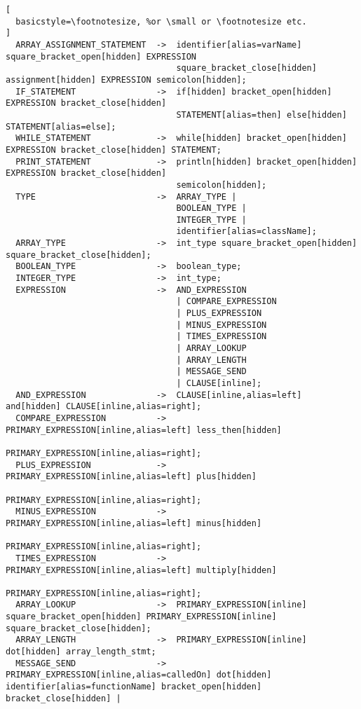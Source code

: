 \begin{lstlisting}[
  basicstyle=\footnotesize, %or \small or \footnotesize etc.
]
  ARRAY_ASSIGNMENT_STATEMENT  ->  identifier[alias=varName] square_bracket_open[hidden] EXPRESSION 
                                  square_bracket_close[hidden] assignment[hidden] EXPRESSION semicolon[hidden];
  IF_STATEMENT                ->  if[hidden] bracket_open[hidden] EXPRESSION bracket_close[hidden] 
                                  STATEMENT[alias=then] else[hidden] STATEMENT[alias=else];
  WHILE_STATEMENT             ->  while[hidden] bracket_open[hidden] EXPRESSION bracket_close[hidden] STATEMENT;
  PRINT_STATEMENT             ->  println[hidden] bracket_open[hidden] EXPRESSION bracket_close[hidden] 
                                  semicolon[hidden];
  TYPE                        ->  ARRAY_TYPE | 
                                  BOOLEAN_TYPE | 
                                  INTEGER_TYPE | 
                                  identifier[alias=className];
  ARRAY_TYPE                  ->  int_type square_bracket_open[hidden] square_bracket_close[hidden];
  BOOLEAN_TYPE                ->  boolean_type;
  INTEGER_TYPE                ->  int_type;
  EXPRESSION                  ->  AND_EXPRESSION
                                  | COMPARE_EXPRESSION
                                  | PLUS_EXPRESSION
                                  | MINUS_EXPRESSION
                                  | TIMES_EXPRESSION
                                  | ARRAY_LOOKUP
                                  | ARRAY_LENGTH
                                  | MESSAGE_SEND
                                  | CLAUSE[inline];
  AND_EXPRESSION              ->  CLAUSE[inline,alias=left] and[hidden] CLAUSE[inline,alias=right];
  COMPARE_EXPRESSION          ->  PRIMARY_EXPRESSION[inline,alias=left] less_then[hidden] 
                                  PRIMARY_EXPRESSION[inline,alias=right];
  PLUS_EXPRESSION             ->  PRIMARY_EXPRESSION[inline,alias=left] plus[hidden] 
                                  PRIMARY_EXPRESSION[inline,alias=right];
  MINUS_EXPRESSION            ->  PRIMARY_EXPRESSION[inline,alias=left] minus[hidden] 
                                  PRIMARY_EXPRESSION[inline,alias=right];
  TIMES_EXPRESSION            ->  PRIMARY_EXPRESSION[inline,alias=left] multiply[hidden] 
                                  PRIMARY_EXPRESSION[inline,alias=right];
  ARRAY_LOOKUP                ->  PRIMARY_EXPRESSION[inline] square_bracket_open[hidden] PRIMARY_EXPRESSION[inline] square_bracket_close[hidden];
  ARRAY_LENGTH                ->  PRIMARY_EXPRESSION[inline] dot[hidden] array_length_stmt;
  MESSAGE_SEND                ->  PRIMARY_EXPRESSION[inline,alias=calledOn] dot[hidden] identifier[alias=functionName] bracket_open[hidden] bracket_close[hidden] |

\end{lstlisting}
